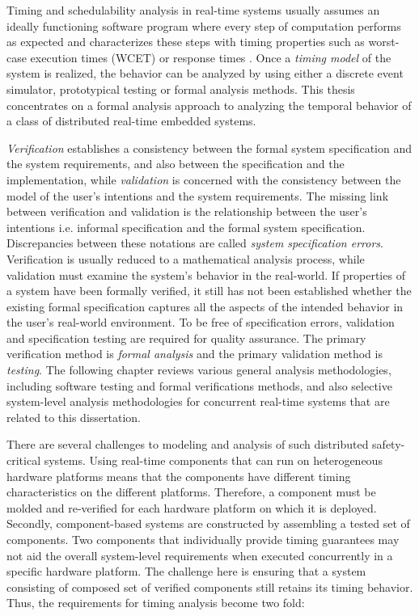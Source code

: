 Timing and schedulability analysis in real-time systems usually assumes an ideally functioning software program where every step of computation performs as expected and characterizes these steps with timing properties such as worst-case execution times (WCET) \cite{wilhelm2008worst} or response times \cite{joseph1986finding}. Once a \emph{timing model} of the system is realized, the behavior can be analyzed by using either a discrete event simulator, prototypical testing or formal analysis methods. This thesis concentrates on a formal analysis approach to analyzing the temporal behavior of a class of distributed real-time embedded systems.

\emph{Verification} establishes a consistency between the formal system specification and the system requirements, and also between the specification and the implementation, while \emph{validation} is concerned with the consistency between the model of the user's intentions and the system requirements. The missing link between verification and validation is the relationship between the user's intentions i.e. informal specification and the formal system specification. Discrepancies between these notations are called \emph{system specification errors}. Verification is usually reduced to a mathematical analysis process, while validation must examine the system's behavior in the real-world. If properties of a system have been formally verified, it still has not been established whether the existing formal specification captures all the aspects of the intended behavior in the user's real-world environment. To be free of specification errors, validation and specification testing are required for quality assurance. The primary verification method is \emph{formal analysis} and the primary validation method is \emph{testing}. The following chapter reviews various general analysis methodologies, including software testing and formal verifications methods, and also selective system-level analysis methodologies for concurrent real-time systems that are related to this dissertation. 


There are several challenges to modeling and analysis of such distributed safety-critical systems. Using real-time components that can run on heterogeneous hardware platforms means that the components have different timing characteristics on the different platforms. Therefore, a component must be molded and re-verified for each hardware platform on which it is deployed. Secondly, component-based systems are constructed by assembling a tested set of components. Two components that individually provide timing guarantees may not aid the overall system-level requirements when executed concurrently in a specific hardware platform. The challenge here is ensuring that a system consisting of composed set of verified components still retains its timing behavior. Thus, the requirements for timing analysis become two fold: 

